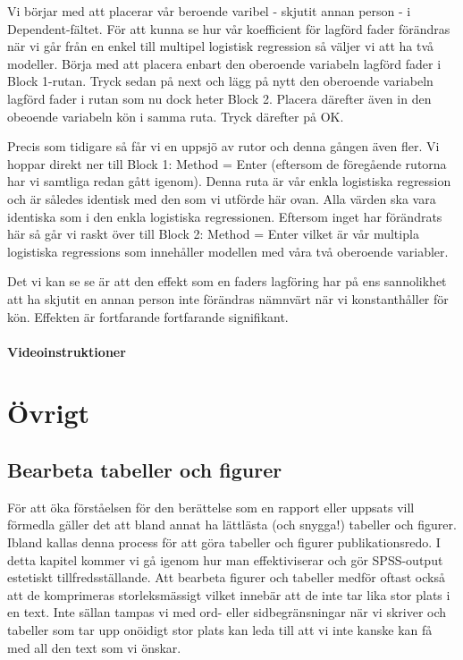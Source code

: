 \documentclass[
]{book}
\begin{document}
Vi börjar med att placerar vår beroende varibel - skjutit annan person - i Dependent-fältet. För att kunna se hur vår koefficient för lagförd fader förändras när vi går från en enkel till multipel logistisk regression så väljer vi att ha två modeller. Börja med att placera enbart den oberoende variabeln lagförd fader i Block 1-rutan. Tryck sedan på next och lägg på nytt den oberoende variabeln lagförd fader i rutan som nu dock heter Block 2. Placera därefter även in den obeoende variabeln kön i samma ruta. Tryck därefter på OK.

Precis som tidigare så får vi en uppsjö av rutor och denna gången även fler. Vi hoppar direkt ner till Block 1: Method = Enter (eftersom de föregående rutorna har vi samtliga redan gått igenom). Denna ruta är vår enkla logistiska regression och är således identisk med den som vi utförde här ovan. Alla värden ska vara identiska som i den enkla logistiska regressionen. Eftersom inget har förändrats här så går vi raskt över till Block 2: Method = Enter vilket är vår multipla logistiska regressions som innehåller modellen med våra två oberoende variabler.

Det vi kan se se är att den effekt som en faders lagföring har på ens sannolikhet att ha skjutit en annan person inte förändras nämnvärt när vi konstanthåller för kön. Effekten är fortfarande fortfarande signifikant.

\hypertarget{videoinstruktioner-13}{%
\subsection{Videoinstruktioner}\label{videoinstruktioner-13}}

\hypertarget{part-uxf6vrigt}{%
\part*{Övrigt}\label{part-uxf6vrigt}}

\hypertarget{bearbeta-tabeller-och-figurer}{%
\chapter{Bearbeta tabeller och figurer}\label{bearbeta-tabeller-och-figurer}}

För att öka förståelsen för den berättelse som en rapport eller uppsats vill förmedla gäller det att bland annat ha lättlästa (och snygga!) tabeller och figurer. Ibland kallas denna process för att göra tabeller och figurer publikationsredo. I detta kapitel kommer vi gå igenom hur man effektiviserar och gör SPSS-output estetiskt tillfredsställande. Att bearbeta figurer och tabeller medför oftast också att de komprimeras storleksmässigt vilket innebär att de inte tar lika stor plats i en text. Inte sällan tampas vi med ord- eller sidbegränsningar när vi skriver och tabeller som tar upp onöidigt stor plats kan leda till att vi inte kanske kan få med all den text som vi önskar.
\end{document}
